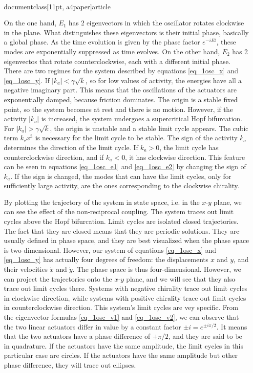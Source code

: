 \\documentclass[11pt, a4paper]{article} %
\newcommand{\xd}{\dot{x}}
\newcommand{\yd}{\dot{y}}
\begin{document}
    On the one hand, $E_1$ has 2 eigenvectors in which the oscillator rotates clockwise in the plane. 
    What distinguishes these eigenvectors is their initial phase, basically a global phase. As the time evolution is given by the 
    phase factor $e^{-iEt}$, these modes are exponentially suppressed as time evolves.
    On the other hand, $E_2$ has 2 eigenvectos that rotate counterclockwise, each with a different initial phase. 
    There are two regimes for the system described by equations \eqref{eq_1osc_x} and \eqref{eq_1osc_y}. 
    If $|k_a| < \gamma \sqrt{k}$, so for low values of activity, the energies have all a negative imaginary part. 
    This means that the oscillations of the actuators are exponentially damped, because friction dominates. The origin is a stable fixed point, 
    so the system becomes at rest and there is no motion. However, if the activity $|k_a|$ is increased, the system undergoes a supercritical 
    Hopf bifurcation. For $|k_a| > \gamma \sqrt{k}$, the origin is unstable and a stable limit cycle appears. The cubic 
    term $k_cx^3$ is necessary for the limit cycle to be stable. The sign of the activity $k_a$ determines the direction of 
    the limit cycle. If $k_a>0$, the limit cycle has counterclockwise direction, and if $k_a<0$, it has clockwise direction. 
    This feature can be seen in equations \eqref{eq_1osc_e1} and \eqref{eq_1osc_e2} by changing the sign of $k_a$. If the sign is changed, 
    the modes that can have the limit cycles, only for sufficiently large activity, are the ones corresponding to the clockwise chirality. 

    By plotting the trajectory of the system in state space, i.e. in the $x$-$y$ plane, we can see the effect of the non-reciprocal coupling.
    The system traces out limit cycles above the Hopf bifurcation. Limit cycles are isolated closed trajectories. 
    The fact that they are closed means that they are periodic solutions. They are usually defined in phase space, 
    and they are best visualized when the phase space is two-dimensional. However, our system 
    of equations \eqref{eq_1osc_x} and \eqref{eq_1osc_y} has actually four degrees of freedom: 
    the displacements $x$ and $y$, and their velocities $\xd$ and $\yd$. The phase space is thus four-dimensional.
    However, we can project the trajectories onto the $x$-$y$ plane, and we will see that they also trace out limit cycles there.
    Systems with negative chirality trace out limit cycles in clockwise direction, 
    while systems with positive chirality trace out limit cycles in counterclockwise direction. 
    This system's limit cycles are vey specific. From the eigenvector formulas \eqref{eq_1osc_v1} and \eqref{eq_1osc_v2}, 
    we can observe that the two linear actuators differ in value by a constant factor $\pm i = e^{\pm i\pi/2}$. 
    It means that the two actuators have a phase difference of $\pm \pi/2$, and they are said to be in quadrature. 
    If the actuators have the same amplitude, the limit cycles in this particular case are circles. If the actuators 
    have the same amplitude but other phase difference, they will trace out ellipses. 
\end{document}

